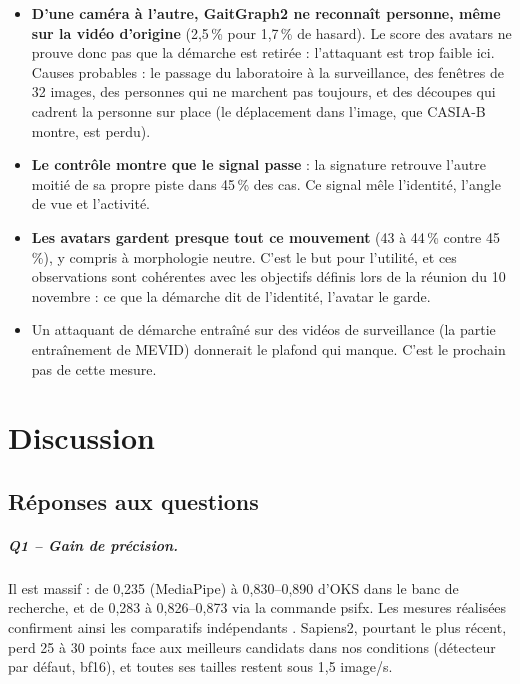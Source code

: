 \documentclass[11pt,a4paper]{report}
\begin{document}
\begin{itemize}
    \item \textbf{D'une caméra à l'autre, GaitGraph2 ne reconnaît personne, même sur la vidéo d'origine} (2,5\,\% pour 1,7\,\% de
    hasard). Le score des avatars ne prouve donc pas que la démarche est retirée : l'attaquant est trop faible ici. Causes probables :
    le passage du laboratoire à la surveillance, des fenêtres de 32 images, des personnes qui ne marchent pas toujours, et des
    découpes qui cadrent la personne sur place (le déplacement dans l'image, que CASIA-B montre, est perdu).
    \item \textbf{Le contrôle montre que le signal passe} : la signature retrouve l'autre moitié de sa propre piste dans 45\,\% des
    cas. Ce signal mêle l'identité, l'angle de vue et l'activité.
    \item \textbf{Les avatars gardent presque tout ce mouvement} (43 à 44\,\% contre 45\,\%), y compris à morphologie neutre. C'est le
    but pour l'utilité, et ces observations sont cohérentes avec les objectifs définis lors de la réunion du 10 novembre : ce que la 
    démarche dit de l'identité, l'avatar le garde.
    \item Un attaquant de démarche entraîné sur des vidéos de surveillance (la partie entraînement de MEVID) donnerait le plafond qui
    manque. C'est le prochain pas de cette mesure.
\end{itemize}

\chapter{Discussion}
\label{chap:discussion}

\section{Réponses aux questions}

\paragraph{Q1 -- Gain de précision.} Il est massif : de 0,235 (MediaPipe) à 0,830--0,890 d'OKS dans le banc de
recherche, et de 0,283 à 0,826--0,873 via la commande psifx. Les mesures réalisées confirment ainsi les comparatifs
indépendants \cite{circus2026mediapipe,gait2022comparison}. Sapiens2, pourtant le plus récent, perd 25 à 30 points
face aux meilleurs candidats dans nos conditions (détecteur par défaut, bf16), et toutes ses tailles restent sous
1,5 image/s.
\end{document}
